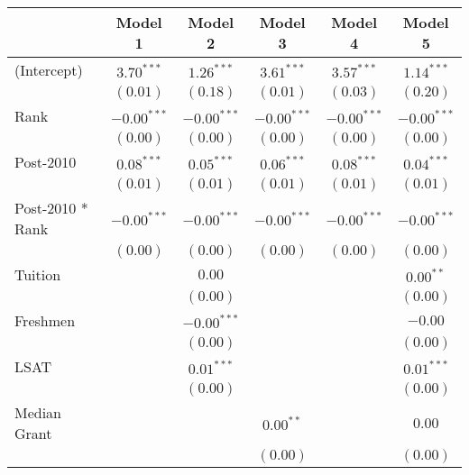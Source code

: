 \clearpage
\begin{table}
\begin{center}
\begin{tabular}{l c c c c c }
\hline
                      & Model 1 & Model 2 & Model 3 & Model 4 & Model 5 \\
\hline
(Intercept)           & $3.70^{***}$  & $1.26^{***}$  & $3.61^{***}$  & $3.57^{***}$  & $1.14^{***}$  \\
                      & $(0.01)$      & $(0.18)$      & $(0.01)$      & $(0.03)$      & $(0.20)$      \\
Rank                  & $-0.00^{***}$ & $-0.00^{***}$ & $-0.00^{***}$ & $-0.00^{***}$ & $-0.00^{***}$ \\
                      & $(0.00)$      & $(0.00)$      & $(0.00)$      & $(0.00)$      & $(0.00)$      \\
Post-2010             & $0.08^{***}$  & $0.05^{***}$  & $0.06^{***}$  & $0.08^{***}$  & $0.04^{***}$  \\
                      & $(0.01)$      & $(0.01)$      & $(0.01)$      & $(0.01)$      & $(0.01)$      \\
Post-2010 * Rank      & $-0.00^{***}$ & $-0.00^{***}$ & $-0.00^{***}$ & $-0.00^{***}$ & $-0.00^{***}$ \\
                      & $(0.00)$      & $(0.00)$      & $(0.00)$      & $(0.00)$      & $(0.00)$      \\
Tuition               &               & $0.00$        &               &               & $0.00^{**}$   \\
                      &               & $(0.00)$      &               &               & $(0.00)$      \\
Freshmen              &               & $-0.00^{***}$ &               &               & $-0.00$       \\
                      &               & $(0.00)$      &               &               & $(0.00)$      \\
LSAT                  &               & $0.01^{***}$  &               &               & $0.01^{***}$  \\
                      &               & $(0.00)$      &               &               & $(0.00)$      \\
Median Grant          &               &               & $0.00^{**}$   &               & $0.00$        \\
                      &               &               & $(0.00)$      &               & $(0.00)$      \\

\end{tabular}
\end{center}
\end{table}
